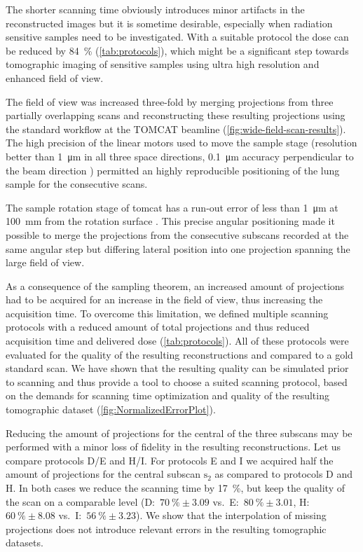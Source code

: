 The shorter scanning time obviously introduces minor artifacts in the reconstructed images but it is sometime desirable, especially when radiation sensitive samples need to be investigated. With a suitable protocol the dose can be reduced by \SI{84}{\percent} (\autoref{tab:protocols}), which might be a significant step towards tomographic imaging of sensitive samples using ultra high resolution and enhanced field of view. 

The field of view was increased three-fold by merging projections from three partially overlapping scans and reconstructing these resulting projections using the standard workflow at the TOMCAT beamline (\autoref{fig:wide-field-scan-results}). The high precision of the linear motors used to move the sample stage (resolution better than \SI{1}{\micro\meter} in all three space directions, \SI{0.1}{\micro\meter} accuracy perpendicular to the beam direction \cite{Stampanoni2006a}) permitted an highly reproducible positioning of the lung sample for the consecutive scans.

The sample rotation stage of \ac{tomcat} has a run-out error of less than \SI{1}{\micro\meter} at \SI{100}{\milli\meter} from the rotation surface \cite{Stampanoni2006a}. This precise angular positioning made it possible to merge the projections from the consecutive subscans recorded at the same angular step but differing lateral position into one projection spanning the large field of view.

As a consequence of the sampling theorem, an increased amount of projections had to be acquired for an increase in the field of view, thus increasing the acquisition time. To overcome this limitation, we defined multiple scanning protocols with a reduced amount of total projections and thus reduced acquisition time and delivered dose (\autoref{tab:protocols}). All of these protocols were evaluated for the quality of the resulting reconstructions and compared to a gold standard scan. We have shown that the resulting quality can be simulated prior to scanning and thus provide a tool to choose a suited scanning protocol, based on the demands for scanning time optimization and quality of the resulting tomographic dataset (\autoref{fig:NormalizedErrorPlot}). 

Reducing the amount of projections for the central of the three subscans may be performed with a minor loss of fidelity in the resulting reconstructions. Let us compare protocols D/E and H/I. For protocols E and I we acquired half the amount of projections for the central subscan $\textrm{s}_{2}$ as compared to protocols D and H. In both cases we reduce the scanning time by \SI{17}{\percent}, but keep the quality of the scan on a comparable level (D:~$\SI{70}{\percent}\pm3.09$ vs.\ E:~$\SI{80}{\percent}\pm3.01$, H:~$\SI{60}{\percent}\pm8.08$ vs.\ I:~$\SI{56}{\percent}\pm3.23$).
We show that the interpolation of missing projections does not introduce relevant errors in the resulting tomographic datasets.

